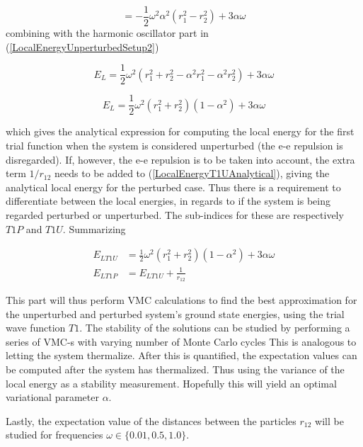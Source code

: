 \documentclass[aip,nobalancelastpage,
twocolumn,
rsi,%
 amsmath,amssymb,
 reprint,%
]{revtex4}
\begin{document}
\begin{equation}
= -\frac{1}{2}\omega^2\alpha^2\left(r_1^2 - r_2^2\right) + 3\alpha \omega
\end{equation}
combining with the harmonic oscillator part in (\ref{LocalEnergyUnperturbedSetup2})

\begin{equation}
E_L = \frac{1}{2}\omega^2 (r_1^2 + r_2^2 - \alpha^2 r_1^2 - \alpha^2 r_2^2) + 3\alpha \omega
\end{equation}

\begin{equation}
\label{LocalEnergyT1UAnalytical}
E_L = \frac{1}{2}\omega^2 \left(r_1^2 + r_2^2\right) \left(1-\alpha^2\right) + 3\alpha \omega
\end{equation}

which gives the analytical expression for computing the local energy for the first trial function when the system is considered unperturbed (the e-e repulsion is disregarded). If, however, the e-e repulsion is to be taken into account, the extra term $1/r_{12}$ needs to be added to (\ref{LocalEnergyT1UAnalytical}), giving the analytical local energy for the perturbed case. Thus there is a requirement to differentiate between the local energies, in regards to if the system is being regarded perturbed or unperturbed. The sub-indices for these are respectively $T1P$ and $T1U$. Summarizing

\begin{align}
E_{LT1U} &= \frac{1}{2}\omega^2 \left(r_1^2 + r_2^2\right) \left(1-\alpha^2\right) + 3\alpha \omega \\
E_{LT1P} &= E_{LT1U} + \frac{1}{r_{12}}
\end{align}


This part will thus perform VMC calculations to find the best approximation for the unperturbed and perturbed system's ground state energies, using the trial wave function $T1$. The stability of the solutions can be studied by performing a series of VMC-s with varying number of Monte Carlo cycles  This is analogous to letting the system thermalize. After this is quantified, the expectation values can be computed after the system has thermalized. Thus using the variance of the local energy as a stability measurement. Hopefully this will yield an optimal variational parameter $\alpha$. \par
 Lastly, the expectation value of the distances between the particles $r_{12}$ will be studied for frequencies $\omega \in \{0.01, 0.5, 1.0\}$.
\end{document}
